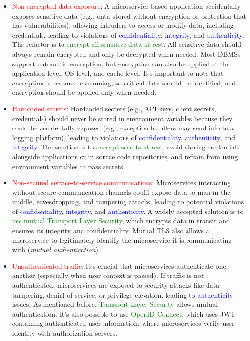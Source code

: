 \begin{itemize}
    \item \textcolor{red}{Non-encrypted data exposure}: A microservice-based application accidentally exposes sensitive data (e.g., data stored without encryption or protection that has vulnerabilities), allowing intruders to access or modify data, including credentials, leading to violations of \textcolor{blue}{confidentiality}, \textcolor{blue}{integrity}, and \textcolor{blue}{authenticity}. The refactor is to \textcolor{green}{encrypt all sensitive data at rest}: All sensitive data should always remain encrypted and only be decrypted when needed. Most DBMSs support automatic encryption, but encryption can also be applied at the application level, OS level, and cache level. It's important to note that encryption is resource-consuming, so critical data should be identified, and encryption should be applied only when needed.
    \item \textcolor{red}{Hardcoded secrets}: Hardcoded secrets (e.g., API keys, client secrets, credentials) should never be stored in environment variables because they could be accidentally exposed (e.g., exception handlers may send info to a logging platform), leading to violations of \textcolor{blue}{confidentiality}, \textcolor{blue}{authenticity}, and \textcolor{blue}{integrity}. The solution is to \textcolor{green}{encrypt secrets at rest}, avoid storing credentials alongside applications or in source code repositories, and refrain from using environment variables to pass secrets.
    \item \textcolor{red}{Non-secured service-to-service communications}: Microservices interacting without secure communication channels could expose data to man-in-the-middle, eavesdropping, and tampering attacks, leading to potential violations of \textcolor{blue}{confidentiality}, \textcolor{blue}{integrity}, and \textcolor{blue}{authenticity}. A widely accepted solution is to \textcolor{green}{use mutual Transport Layer Security}, which encrypts data in transit and ensures its integrity and confidentiality. Mutual TLS also allows a microservice to legitimately identify the microservice it is communicating with (\textit{mutual authentication}).
    \item \textcolor{red}{Unauthenticated traffic}: It's crucial that microservices authenticate one another (especially when user context is passed). If traffic is not authenticated, microservices are exposed to security attacks like data tampering, denial of service, or privilege elevation, leading to \textcolor{blue}{authenticity} issues. As mentioned before, \textcolor{green}{Transport Layer Security} allows mutual authentication. It's also possible to use \textcolor{green}{OpenID Connect}, which uses JWT containing authenticated user information, where microservices verify user identity with authorization servers.

\end{itemize}

